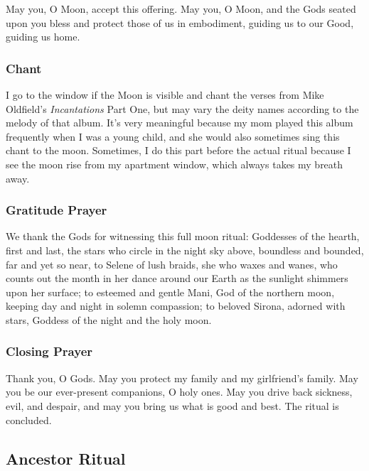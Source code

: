 \documentclass[
]{book}
\begin{document}
May you, O Moon, accept this offering.
May you, O Moon, and the Gods seated upon you
bless and protect those of us in embodiment,
guiding us to our Good, guiding us home.

\hypertarget{chant}{%
\subsubsection{Chant}\label{chant}}

I go to the window if the Moon is visible and chant the verses from Mike Oldfield's \emph{Incantations} Part One, but may vary the deity names according to the melody of that album. It's very meaningful because my mom played this album frequently when I was a young child, and she would also sometimes sing this chant to the moon. Sometimes, I do this part before the actual ritual because I see the moon rise from my apartment window, which always takes my breath away.

\hypertarget{gratitude-prayer-2}{%
\subsubsection{Gratitude Prayer}\label{gratitude-prayer-2}}

We thank the Gods for witnessing this full moon ritual:
Goddesses of the hearth, first and last,
the stars who circle in the night sky above,
boundless and bounded, far and yet so near,
to Selene of lush braids,
she who waxes and wanes,
who counts out the month in her dance
around our Earth as the sunlight shimmers upon her surface;
to esteemed and gentle Mani,
God of the northern moon,
keeping day and night in solemn compassion;
to beloved Sirona, adorned with stars,
Goddess of the night and the holy moon.

\hypertarget{closing-prayer-2}{%
\subsubsection{Closing Prayer}\label{closing-prayer-2}}

Thank you, O Gods.
May you protect my family and my girlfriend's family.
May you be our ever-present companions, O holy ones.
May you drive back sickness, evil, and despair,
and may you bring us what is good and best.
The ritual is concluded.

\hypertarget{ancestor-ritual}{%
\subsection{Ancestor Ritual}\label{ancestor-ritual}}
\end{document}
